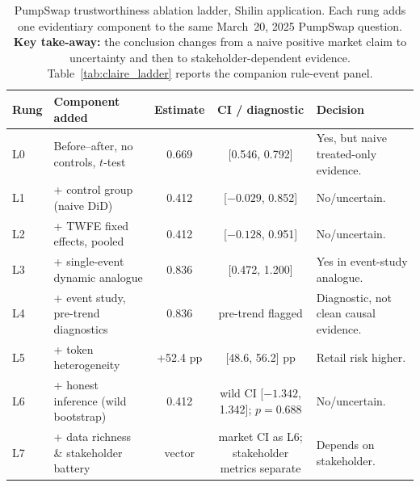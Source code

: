 \begin{table}[t]
  \caption{PumpSwap trustworthiness ablation ladder, Shilin application. Each
  rung adds one evidentiary component to the same March~20, 2025 PumpSwap
  question. \textbf{Key take-away:} the conclusion changes from a naive
  positive market claim to uncertainty and then to stakeholder-dependent
  evidence. Table~\ref{tab:claire_ladder} reports the companion rule-event panel.}
  \label{tab:ablation}
  \centering
  \footnotesize
  \setlength{\tabcolsep}{4pt}
  \begin{tabularx}{\textwidth}{@{}l >{\raggedright\arraybackslash}X c c >{\raggedright\arraybackslash}X@{}}
    \toprule
    \textbf{Rung} & \textbf{Component added} & \textbf{Estimate} &
    \textbf{CI / diagnostic} & \textbf{Decision} \\
    \midrule
    L0 & Before--after, no controls, $t$-test
      & 0.669 & [0.546, 0.792] & Yes, but naive treated-only evidence. \\
    L1 & + control group (naive DiD)
      & 0.412 & [$-0.029$, 0.852] & No/uncertain. \\
    L2 & + TWFE fixed effects, pooled
      & 0.412 & [$-0.128$, 0.951] & No/uncertain. \\
    L3 & + single-event dynamic analogue
      & 0.836 & [0.472, 1.200] & Yes in event-study analogue. \\
    L4 & + event study, pre-trend diagnostics
      & 0.836 & pre-trend flagged & Diagnostic, not clean causal evidence. \\
    L5 & + token heterogeneity
      & +52.4 pp & [48.6, 56.2] pp & Retail risk higher. \\
    L6 & + honest inference (wild bootstrap)
      & 0.412 & wild CI [$-1.342$, 1.342]; $p=0.688$ & No/uncertain. \\
    \rowcolor{okgreen!8}
    L7 & + data richness \& stakeholder battery
      & vector & market CI as L6; stakeholder metrics separate &
      Depends on stakeholder. \\
    \bottomrule
  \end{tabularx}
\end{table}
